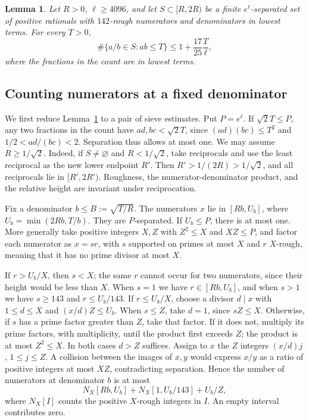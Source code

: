 \documentclass[11pt,a4paper]{article}
\newtheorem{lemma}[theorem]{Lemma}
\begin{document}
\begin{lemma}\label{lem:rc}
Let \(R>0\), \(\ell\ge4096\), and let \(S\subset[R,2R)\) be a finite
\(e^\ell\)-separated set of positive rationals with \(142\)-rough
numerators and denominators in lowest terms. For every \(T>0\),
\[
 \#\{a/b\in S:ab\le T\}\le 1+\frac{17}{25}\frac T\ell,
\]
where the fractions in the count are in lowest terms.
\end{lemma}

\subsection{Counting numerators at a fixed denominator}

We first reduce Lemma~\ref{lem:rc} to a pair of sieve estimates.
Put \(P=e^\ell\). If \(\sqrt2 T\le P\), any two fractions in the
count have \(ad,bc<\sqrt2 T\), since \((ad)(bc)\le T^2\) and
\(1/2<ad/(bc)<2\). Separation thus allows at most one.
We may assume \(R\ge1/\sqrt2\). Indeed, if \(S\ne\varnothing\) and
\(R<1/\sqrt2\), take reciprocals and use the least reciprocal as the
new lower endpoint \(R'\). Then \(R'>1/(2R)>1/\sqrt2\), and all
reciprocals lie in \([R',2R')\). Roughness, the numerator-denominator
product, and the relative height are invariant under reciprocation.

Fix a denominator \(b\le B:=\sqrt{T/R}\). The numerators \(x\) lie in
\([Rb,U_b]\), where \(U_b=\min(2Rb,T/b)\). They are \(P\)-separated.
If \(U_b\le P\), there is at most one. More generally take positive
integers \(X,Z\) with \(Z^2\le X\) and \(XZ\le P\), and factor each
numerator as \(x=sr\), with \(s\) supported on primes at most \(X\)
and \(r\) \(X\)-rough, meaning that it has no prime divisor at most \(X\).

If \(r>U_b/X\), then \(s<X\); the same \(r\) cannot occur for two
numerators, since their height would be less than \(X\).
When \(s=1\) we have \(r\in[Rb,U_b]\), and when \(s>1\) we have
\(s\ge143\) and \(r\le U_b/143\).
If \(r\le U_b/X\), choose a divisor \(d\mid x\) with
\(1\le d\le X\) and \((x/d)Z\le U_b\).
When \(s\le Z\), take \(d=1\), since \(sZ\le X\).
Otherwise, if \(s\) has a prime factor greater than \(Z\), take that
factor. If it does not, multiply its prime factors, with multiplicity,
until the product first exceeds \(Z\); the product is at most
\(Z^2\le X\). In both cases \(d>Z\) suffices.
Assign to \(x\) the \(Z\) integers \((x/d)j\), \(1\le j\le Z\).
A collision between the images of \(x,y\) would express \(x/y\) as
a ratio of positive integers at most \(XZ\), contradicting separation.
Hence the number of numerators at denominator \(b\) is at most
\[
 N_X[Rb,U_b]+N_X[1,U_b/143]+U_b/Z,
\]
where \(N_X[I]\) counts the positive \(X\)-rough integers in \(I\).
An empty interval contributes zero.
\end{document}
